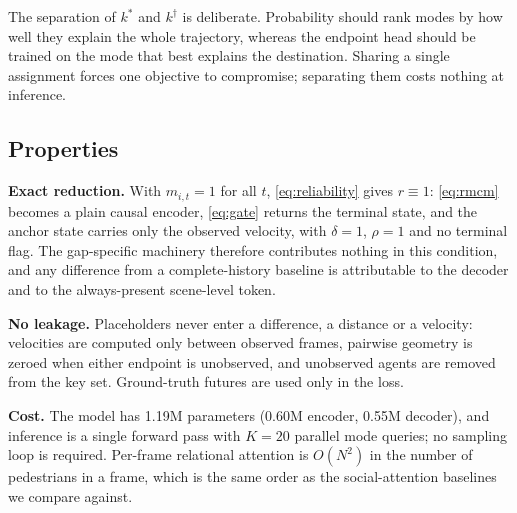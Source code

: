 The separation of $k^{\ast}$ and $k^{\dagger}$ is deliberate. Probability should rank modes by how well they explain the whole trajectory, whereas the endpoint head should be trained on the mode that best explains the destination. Sharing a single assignment forces one objective to compromise; separating them costs nothing at inference.

\subsection{Properties}

\textbf{Exact reduction.} With $m_{i,t}=1$ for all $t$, \eqref{eq:reliability} gives $r\equiv1$: \eqref{eq:rmcm} becomes a plain causal encoder, \eqref{eq:gate} returns the terminal state, and the anchor state carries only the observed velocity, with $\delta=1$, $\rho=1$ and no terminal flag. The gap-specific machinery therefore contributes nothing in this condition, and any difference from a complete-history baseline is attributable to the decoder and to the always-present scene-level token.

\textbf{No leakage.} Placeholders never enter a difference, a distance or a velocity: velocities are computed only between observed frames, pairwise geometry is zeroed when either endpoint is unobserved, and unobserved agents are removed from the key set. Ground-truth futures are used only in the loss.

\textbf{Cost.} The model has 1.19M parameters (0.60M encoder, 0.55M decoder), and inference is a single forward pass with $K=20$ parallel mode queries; no sampling loop is required. Per-frame relational attention is $O(N^{2})$ in the number of pedestrians in a frame, which is the same order as the social-attention baselines we compare against.
